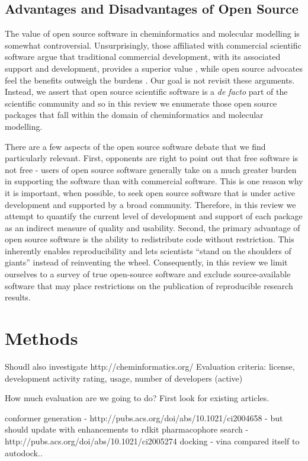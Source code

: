 \subsection*{Advantages and Disadvantages of Open Source}

The value of open source software in cheminformatics and molecular modelling is somewhat controversial.  Unsurprisingly, those affiliated with commercial scientific software argue that traditional commercial development, with its associated support and development, provides a superior value \cite{Krylov_2015}, while open source advocates feel the benefits outweigh the burdens \cite{Gezelter_2015,Jacob_2016}. Our goal is not revisit these arguments.  Instead, we assert that open source scientific software is a \textit{de facto} part of the scientific community and so in this review we enumerate those open source packages that fall within the domain of cheminformatics and molecular modelling.

There are a few aspects of the open source software debate that we find particularly relevant.  First, opponents are right to point out that free software is not free - users of open source software generally take on a much greater burden in supporting the software than with commercial software.  This is one reason why it is important, when possible, to seek open source software that is under active development and supported by a broad community.  Therefore, in this review we attempt to quantify the current level of development and support of each package as an indirect measure of quality and usability.  Second, the primary advantage of open source software is the ability to redistribute code without restriction.  This inherently enables reproducibility and lets scientists ``stand on the shoulders of giants'' instead of reinventing the wheel. Consequently, in this review we limit ourselves to a survey of true open-source software and exclude source-available software that may place restrictions on the publication of reproducible research results.

\section{Methods}

Shoudl also investigate http://cheminformatics.org/
Evaluation criteria: license, development activity rating, usage, number of developers (active)


 
 
 How much evaluation are we going to do?  First look for existing articles.
 
 conformer generation - http://pubs.acs.org/doi/abs/10.1021/ci2004658 - but should update with enhancements to rdkit
 pharmacophore search - http://pubs.acs.org/doi/abs/10.1021/ci2005274
 docking - vina compared itself to autodock..
  
  
